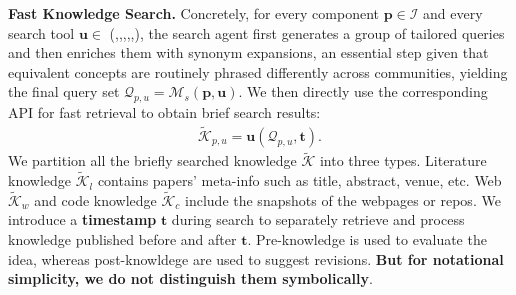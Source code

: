 \textbf{Fast Knowledge Search.}
Concretely, for every component $\boldsymbol{p}\in \boldsymbol{\mathcal{I}}$ and every search tool $\boldsymbol{u}\in$ (\arxiv,\semantic,\scholar,\google,\github,\kaggle), the search agent first generates a group of tailored queries and then enriches them with synonym expansions, an essential step given that equivalent concepts are routinely phrased differently across communities, yielding the final query set $\boldsymbol{\mathcal{Q}}_{p,u}=\boldsymbol{\mathcal{M}}_s(\boldsymbol{p},\boldsymbol{u})$.
We then directly use the corresponding API for fast retrieval to obtain brief search results:
\begin{align}
\label{eqn:search}
    \boldsymbol{\widetilde{\mathcal{K}}}_{p,u}=\boldsymbol{u}(\boldsymbol{\mathcal{Q}}_{p,u},\boldsymbol{t}).
\end{align}
We partition all the briefly searched knowledge $\boldsymbol{\widetilde{\mathcal{K}}}$ into three types.
Literature knowledge $\boldsymbol{\widetilde{\mathcal{K}}}_l$ contains papers' meta-info such as title, abstract, venue, etc.
Web $\boldsymbol{\widetilde{\mathcal{K}}}_w$ and code knowledge $\boldsymbol{\widetilde{\mathcal{K}}}_c$ include the snapshots of the webpages or repos.
We introduce a \textbf{timestamp} $\boldsymbol{t}$ during search to separately retrieve and process knowledge published before and after $\boldsymbol{t}$.
Pre-knowledge is used to evaluate the idea, whereas post-knowldege are used to suggest revisions.
\textbf{But for notational simplicity, we do not distinguish them symbolically}.


